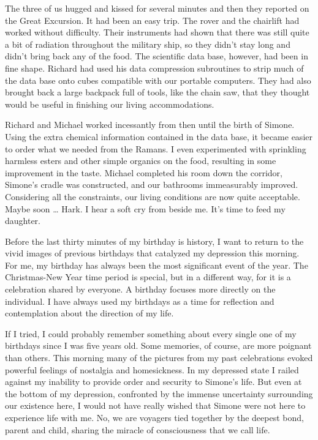 \documentclass[]{article}
\begin{document}
The three of us hugged and kissed for several minutes and then they reported on the Great Excursion.  It had been an easy trip.  The rover and the chairlift had worked without difficulty.  Their instruments had shown that there was still quite a bit of radiation throughout the military ship, so they didn’t stay long and didn’t bring back any of the food.  The scientific data base, however, had been in fine shape.  Richard had used his data compression subroutines to strip much of the data base onto cubes compatible with our portable computers.  They had also brought back a large backpack full of tools, like the chain saw, that they thought would be useful in finishing our living accommodations.

Richard and Michael worked incessantly from then until the birth of Simone.  Using the extra chemical information contained in the data base, it became easier to order what we needed from the Ramans.  I even experimented with sprinkling harmless esters and other simple organics on the food, resulting in some improvement in the taste.  Michael completed his room down the corridor, Simone’s cradle was constructed, and our bathrooms immeasurably improved.  Considering all the constraints, our living conditions are now quite acceptable.  Maybe soon … Hark.  I hear a soft cry from beside me.  It’s time to feed my daughter.

Before the last thirty minutes of my birthday is history, I want to return to the vivid images of previous birthdays that catalyzed my depression this morning.  For me, my birthday has always been the most significant event of the year.  The Christmas-New Year time period is special, but in a different way, for it is a celebration shared by everyone.  A birthday focuses more directly on the individual.  I have always used my birthdays as a time for reflection and contemplation about the direction of my life.

If I tried, I could probably remember something about every single one of my birthdays since I was five years old.  Some memories, of course, are more poignant than others.  This morning many of the pictures from my past celebrations evoked powerful feelings of nostalgia and homesickness.  In my depressed state I railed against my inability to provide order and security to Simone’s life.  But even at the bottom of my depression, confronted by the immense uncertainty surrounding our existence here, I would not have really wished that Simone were not here to experience life with me.  No, we are voyagers tied together by the deepest bond, parent and child, sharing the miracle of consciousness that we call life.
\end{document}
